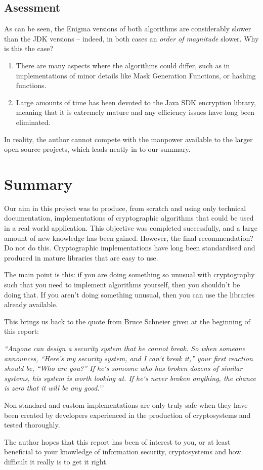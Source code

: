   \subsection{Asessment}
  
  As can be seen, the Enigma versions of both algorithms are considerably slower than the JDK versions -- indeed, in both cases an \emph{order of magnitude} slower. Why is this the case? 
  
  \begin{enumerate}
    \item There are many aspects where the algorithms could differ, such as in implementations of minor details like Mask Generation Functions, or hashing functions.
    \item Large amounts of time has been devoted to the Java SDK encryption library, meaning that it is extremely mature and any efficiency issues have long been eliminated.
  \end{enumerate}
  
  In reality, the author cannot compete with the manpower available to the larger open source projects, which leads neatly in to our summary.

\section{Summary}

Our aim in this project was to produce, from scratch and using only technical documentation, implementations of cryptographic algorithms that could be used in a real world application. This objective was completed successfully, and a large amount of new knowledge has been gained. However, the final recommendation? Do not do this. Cryptographic implementations have long been standardised and produced in mature libraries that are easy to use.

The main point is this: if you are doing something so unusual with cryptography such that you need to implement algorithms yourself, then you shouldn't be doing that. If you aren't doing something unusual, then you can use the libraries already available.

This brings us back to the quote from Bruce Schneier given at the beginning of this report: 

\textit{``Anyone can design a security system that he cannot break. So when someone announces, ``Here’s my security system, and I can`t break it,” your first reaction should be, “Who are you?” If he`s someone who has broken dozens of similar systems, his system is worth looking at. If he`s never broken anything, the chance is zero that it will be any good.''}

Non-standard and custom implementations are only truly safe when they have been created by developers experienced in the production of cryptosystems and tested thoroughly.

The author hopes that this report has been of interest to you, or at least beneficial to your knowledge of information security, cryptosystems and how difficult it really is to get it right.